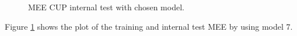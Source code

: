 \begin{figure}[H]%
    \centering
    \caption{MEE CUP internal test with chosen model.}
    \label{fig:cup}%
\end{figure}
Figure \ref{fig:cup} shows the plot of the training and internal test MEE by using model 7.
